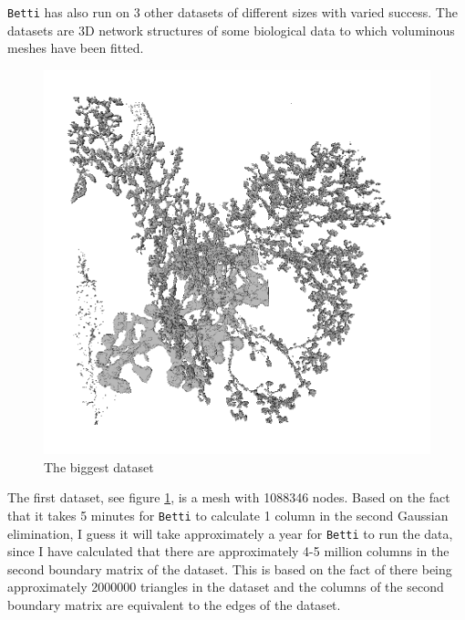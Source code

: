 \documentclass[11pt,a4paper,twoside]{report}
\begin{document}
\texttt{Betti} has also run on 3 other datasets of different sizes with varied success. 
The datasets are 3D network structures of some biological data to which voluminous meshes have been fitted.
\begin{figure}[H]
\center
\includegraphics[scale=0.5]{downsampled00.png}
\caption{The biggest dataset}
\label{fig:mesh_down}
\end{figure}
The first dataset, see figure \ref{fig:mesh_down}, is a mesh with 1088346 nodes. Based on the fact that it takes 5 minutes for \texttt{Betti} to calculate 1 column in the second Gaussian elimination, I guess it will take approximately a year for \texttt{Betti} to run the data, since I have calculated that there are approximately 4-5 million columns in the second boundary matrix of the dataset. This is based on the fact of there being approximately 2000000 triangles in the dataset and the columns of the second boundary matrix are equivalent to the edges of the dataset.
\end{document}
